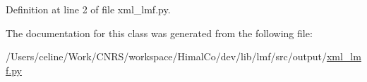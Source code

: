 Definition at line 2 of file xml\+\_\+lmf.\+py.



The documentation for this class was generated from the following file\+:\begin{DoxyCompactItemize}
\item 
/\+Users/celine/\+Work/\+C\+N\+R\+S/workspace/\+Himal\+Co/dev/lib/lmf/src/output/\hyperlink{xml__lmf_8py}{xml\+\_\+lmf.\+py}\end{DoxyCompactItemize}
